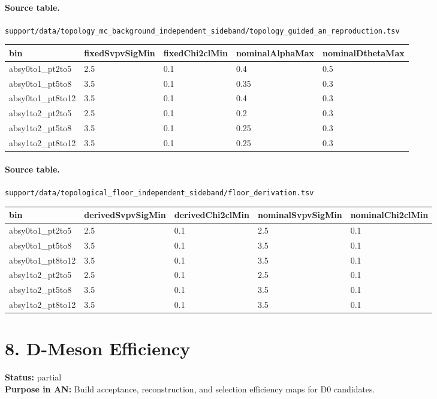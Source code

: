 \documentclass[11pt]{article}
\begin{document}
\paragraph{Source table.} \texttt{support/data/topology\_mc\_background\_independent\_sideband/topology\_guided\_an\_reproduction.tsv}
\begin{center}\scriptsize
\begin{tabular}{|l|l|l|l|l|}
\hline
bin & fixedSvpvSigMin & fixedChi2clMin & nominalAlphaMax & nominalDthetaMax \\ \hline
absy0to1\_pt2to5 & 2.5 & 0.1 & 0.4 & 0.5 \\ \hline
absy0to1\_pt5to8 & 3.5 & 0.1 & 0.35 & 0.3 \\ \hline
absy0to1\_pt8to12 & 3.5 & 0.1 & 0.4 & 0.3 \\ \hline
absy1to2\_pt2to5 & 2.5 & 0.1 & 0.2 & 0.3 \\ \hline
absy1to2\_pt5to8 & 3.5 & 0.1 & 0.25 & 0.3 \\ \hline
absy1to2\_pt8to12 & 3.5 & 0.1 & 0.25 & 0.3 \\ \hline
\end{tabular}
\end{center}
\paragraph{Source table.} \texttt{support/data/topological\_floor\_independent\_sideband/floor\_derivation.tsv}
\begin{center}\scriptsize
\begin{tabular}{|l|l|l|l|l|}
\hline
bin & derivedSvpvSigMin & derivedChi2clMin & nominalSvpvSigMin & nominalChi2clMin \\ \hline
absy0to1\_pt2to5 & 2.5 & 0.1 & 2.5 & 0.1 \\ \hline
absy0to1\_pt5to8 & 3.5 & 0.1 & 3.5 & 0.1 \\ \hline
absy0to1\_pt8to12 & 3.5 & 0.1 & 3.5 & 0.1 \\ \hline
absy1to2\_pt2to5 & 2.5 & 0.1 & 2.5 & 0.1 \\ \hline
absy1to2\_pt5to8 & 3.5 & 0.1 & 3.5 & 0.1 \\ \hline
absy1to2\_pt8to12 & 3.5 & 0.1 & 3.5 & 0.1 \\ \hline
\end{tabular}
\end{center}
\section*{8. D-Meson Efficiency}
\textbf{Status:} partial\\
\textbf{Purpose in AN:} Build acceptance, reconstruction, and selection efficiency maps for D0 candidates.
\end{document}
